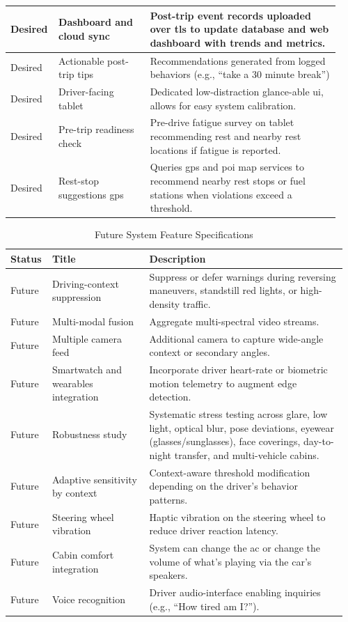 \begin{table}[htbp]
\begin{tabular}{|p{0.11\linewidth}|p{0.27\linewidth}|p{0.56\linewidth}|}
\hline
Desired & Dashboard and cloud sync & Post-trip event records uploaded over \gls{tls} to update database and web dashboard with trends and metrics. \\
\hline
Desired & Actionable post-trip tips & Recommendations generated from logged behaviors (e.g., ``take a 30 minute break'')\\
\hline
Desired & Driver-facing tablet & Dedicated low-distraction glance-able \gls{ui}, allows for easy system calibration.\\
\hline
Desired & Pre-trip readiness check & Pre-drive fatigue survey on tablet recommending rest and nearby rest locations if fatigue is reported.\\
\hline
Desired & Rest-stop suggestions \gls{gps} & Queries \gls{gps} and \gls{poi} map services to recommend nearby rest stops or fuel stations when violations exceed a threshold. \\
\hline
\end{tabular}
\end{table}

\begin{table}[htbp]
\centering
\caption{Future System Feature Specifications}
\label{tab:future-features}
\footnotesize
\setlength{\tabcolsep}{4pt}
\renewcommand{\arraystretch}{1.15}
\begin{tabular}{|p{0.09\linewidth}|p{0.29\linewidth}|p{0.58\linewidth}|}
\hline
\textbf{Status} & \textbf{Title} & \textbf{Description} \\
\hline
Future & Driving-context suppression & Suppress or defer warnings during reversing maneuvers, standstill red lights, or high-density traffic.\\
\hline
Future & Multi-modal fusion & Aggregate multi-spectral video streams. \\
\hline
Future & Multiple camera feed & Additional camera to capture wide-angle context or secondary angles. \\
\hline
Future & Smartwatch and wearables integration & Incorporate driver heart-rate or biometric motion telemetry to augment edge detection.\\
\hline
Future & Robustness study & Systematic stress testing across glare, low light, optical blur, pose deviations, eyewear (glasses/sunglasses), face coverings, day-to-night transfer, and multi-vehicle cabins. \\
\hline
Future & Adaptive sensitivity by context & Context-aware threshold modification depending on the driver's behavior patterns. \\
\hline
Future & Steering wheel vibration & Haptic vibration on the steering wheel to reduce driver reaction latency.  \\
\hline
Future & Cabin comfort integration & System can change the \gls{ac} or change the volume of what's playing via the car's speakers. \\
\hline
Future & Voice recognition & Driver audio-interface enabling inquiries (e.g., ``How tired am I?''). \\
\hline
\end{tabular}
\end{table}
\newpage

